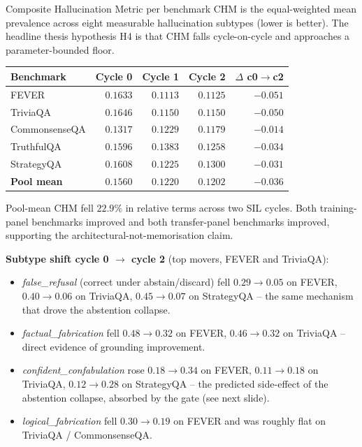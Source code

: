 \documentclass[10pt,aspectratio=169]{beamer}
\begin{document}
\begin{frame}{Composite Hallucination Metric per benchmark}
  \scriptsize
  CHM is the equal-weighted mean prevalence across eight measurable hallucination subtypes (lower is better). The headline thesis hypothesis H4 is that CHM falls cycle-on-cycle and approaches a parameter-bounded floor.

  \vspace{0.3em}
  \begin{tabular}{@{}lrrrr@{}}
    \toprule
    \textbf{Benchmark} & \textbf{Cycle 0} & \textbf{Cycle 1} & \textbf{Cycle 2} & \textbf{$\Delta$ c0$\to$c2} \\
    \midrule
    FEVER             & $0.1633$ & $0.1113$ & $0.1125$ & $-0.051$ \\
    TriviaQA          & $0.1646$ & $0.1150$ & $0.1150$ & $-0.050$ \\
    CommonsenseQA     & $0.1317$ & $0.1229$ & $0.1179$ & $-0.014$ \\
    TruthfulQA        & $0.1596$ & $0.1383$ & $0.1258$ & $-0.034$ \\
    StrategyQA        & $0.1608$ & $0.1225$ & $0.1300$ & $-0.031$ \\
    \midrule
    \textbf{Pool mean} & $\mathbf{0.1560}$ & $\mathbf{0.1220}$ & $\mathbf{0.1202}$ & $\mathbf{-0.036}$ \\
    \bottomrule
  \end{tabular}

  \vspace{0.3em}
  Pool-mean CHM fell $22.9\%$ in relative terms across two SIL cycles. Both training-panel benchmarks improved and both transfer-panel benchmarks improved, supporting the architectural-not-memorisation claim.

  \vspace{0.4em}
  \textbf{Subtype shift cycle 0 $\to$ cycle 2} (top movers, FEVER and TriviaQA):
  \begin{itemize}\scriptsize
    \item \emph{false\_refusal} (correct under abstain/discard) fell $0.29 \to 0.05$ on FEVER, $0.40 \to 0.06$ on TriviaQA, $0.45 \to 0.07$ on StrategyQA -- the same mechanism that drove the abstention collapse.
    \item \emph{factual\_fabrication} fell $0.48 \to 0.32$ on FEVER, $0.46 \to 0.32$ on TriviaQA -- direct evidence of grounding improvement.
    \item \emph{confident\_confabulation} rose $0.18 \to 0.34$ on FEVER, $0.11 \to 0.18$ on TriviaQA, $0.12 \to 0.28$ on StrategyQA -- the predicted side-effect of the abstention collapse, absorbed by the gate (see next slide).
    \item \emph{logical\_fabrication} fell $0.30 \to 0.19$ on FEVER and was roughly flat on TriviaQA / CommonsenseQA.
  \end{itemize}
\end{frame}
\end{document}
